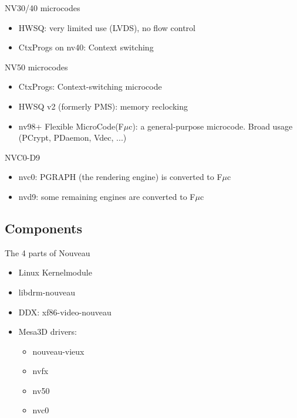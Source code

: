 \documentclass[11pt,english,compress]{beamer}
\begin{document}
		\begin{frame}
			\begin{block}{NV30/40 microcodes}
				\begin{itemize}
					\item HWSQ: very limited use (LVDS), no flow control
					\item CtxProgs on nv40: Context switching
				\end{itemize}
			\end{block}

			\begin{block}{NV50 microcodes}
				\begin{itemize}
					\item CtxProgs: Context-switching microcode
					\item HWSQ v2 (formerly PMS): memory reclocking
					\item nv98+ Flexible MicroCode(F$\mu$c): a general-purpose microcode. Broad usage (PCrypt, PDaemon, Vdec, ...)
				\end{itemize}
			\end{block}

			\begin{block}{NVC0-D9}
				\begin{itemize}
					\item nvc0: PGRAPH (the rendering engine) is converted to F$\mu$c
					\item nvd9: some remaining engines are converted to F$\mu$c
				\end{itemize}
			\end{block}
		\end{frame}

	\subsection{Components}
		\begin{frame}
			\begin{block}{The 4 parts of Nouveau}
				\begin{itemize}
					\item Linux Kernelmodule
					\item libdrm-nouveau
					\item DDX: xf86-video-nouveau
					\item Mesa3D drivers:
						\begin{itemize}
							\item nouveau-vieux
							\item nvfx
							\item nv50
							\item nvc0
						\end{itemize}
				\end{itemize}
			\end{block}
		\end{frame}
\end{document}
